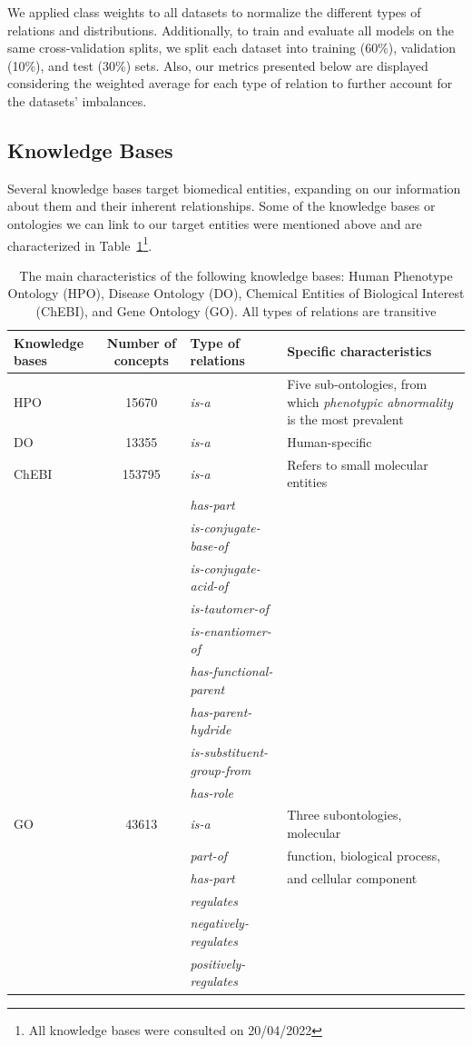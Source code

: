 We applied class weights to all datasets to normalize the different types of relations and distributions. Additionally, to train and evaluate all models on the same cross-validation splits, we split each dataset into training (60\%), validation (10\%), and test (30\%) sets. Also, our metrics presented below are displayed considering the weighted average for each type of relation to further account for the datasets' imbalances. 


\subsection{Knowledge Bases}

Several knowledge bases target biomedical entities, expanding on our information about them and their inherent relationships. Some of the knowledge bases or ontologies we can link to our target entities were mentioned above and are characterized in Table~\ref{Tab:02}\footnote{All knowledge bases were consulted on 20/04/2022}. 

\begin{table}[hbt!]
\centering
\caption[Main Characteristics of Biomedical Knowledge Bases]{The main characteristics of the following knowledge bases: Human Phenotype Ontology (HPO), Disease Ontology (DO), Chemical Entities of Biological Interest (ChEBI), and Gene Ontology (GO). All types of relations are transitive\label{Tab:02}} {\begin{tabular}{@{}lcp{3cm}p{5.5cm}@{}}\hline Knowledge bases &
Number of concepts & Type of relations & Specific characteristics\\\hline
HPO & 15670 & \textit{is-a} & Five sub-ontologies, from which \textit{phenotypic abnormality} is the most prevalent\\
DO & 13355 & \textit{is-a} & Human-specific\\
ChEBI & 153795 & \textit{is-a} & Refers to small molecular entities\\
 & & \textit{has-part} & \\
 & & \textit{is-conjugate-base-of} & \\
 & & \textit{is-conjugate-acid-of} & \\
 & & \textit{is-tautomer-of} & \\
 & & \textit{is-enantiomer-of} & \\
 & & \textit{has-functional-parent} & \\
 & & \textit{has-parent-hydride} & \\
 & & \textit{is-substituent-group-from} & \\
 & & \textit{has-role} & \\
GO & 43613 & \textit{is-a} & Three subontologies, molecular\\
 & & \textit{part-of} & function, biological process,\\
 & & \textit{has-part} & and cellular component\\
 & & \textit{regulates} & \\
 & & \textit{negatively-regulates} & \\
 & & \textit{positively-regulates} & \\\hline
\end{tabular}}
\end{table}

